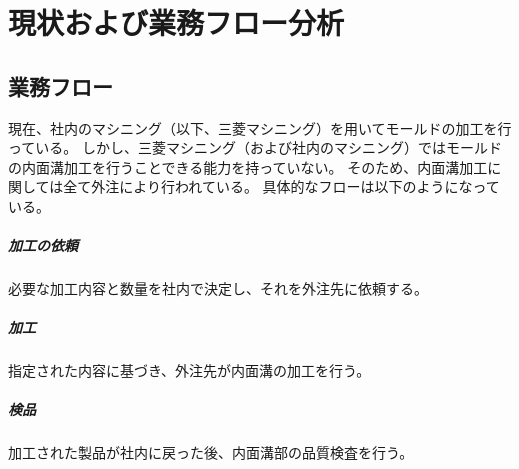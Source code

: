 




\chapter{現状および業務フロー分析}



\section{業務フロー}
現在、社内のマシニング（以下、三菱マシニング）を用いてモールドの加工を行っている。
しかし、三菱マシニング（および社内のマシニング）ではモールドの内面溝加工を行うことできる能力を持っていない。
そのため、内面溝加工に関しては全て外注により行われている。
具体的なフローは以下のようになっている。

\paragraph{加工の依頼}\noindent
必要な加工内容と数量を社内で決定し、それを外注先に依頼する。

\paragraph{加工}\noindent
指定された内容に基づき、外注先が内面溝の加工を行う。

\paragraph{検品}\noindent
加工された製品が社内に戻った後、内面溝部の品質検査を行う。



\section{}



